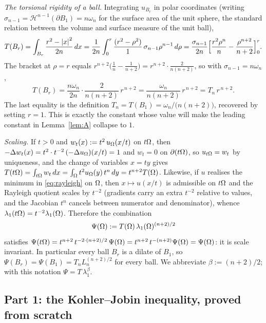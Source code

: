 \emph{The torsional rigidity of a ball.} Integrating $u_{B_r}$ in polar
coordinates (writing $\sigma_{n-1}=\mathcal H^{n-1}(\partial B_1)=n\omega_n$
for the surface area of the unit sphere, the standard relation between the
volume and surface measure of the unit ball),
\[
  T(B_r)=\int_{B_r}\frac{r^2-\left|x\right|^2}{2n}\,dx
  =\frac{1}{2n}\int_0^r\frac{(r^2-\rho^2)}{1}\,\sigma_{n-1}\rho^{n-1}\,d\rho
  =\frac{\sigma_{n-1}}{2n}\Bigl[\frac{r^2\rho^n}{n}-\frac{\rho^{n+2}}{n+2}
     \Bigr]_0^r .
\]
The bracket at $\rho=r$ equals
$r^{n+2}\bigl(\tfrac1n-\tfrac1{n+2}\bigr)
=r^{n+2}\cdot\tfrac{2}{n(n+2)}$, so with $\sigma_{n-1}=n\omega_n$,
\begin{equation}\label{eq:torsionball}
  T(B_r)=\frac{n\omega_n}{2n}\cdot\frac{2}{n(n+2)}\,r^{\,n+2}
  =\frac{\omega_n}{n(n+2)}\,r^{\,n+2}=T_n\,r^{\,n+2}.
\end{equation}
The last equality is the definition $T_n=T(B_1)=\omega_n/\bigl(n(n+2)\bigr)$,
recovered by setting $r=1$. This is exactly the constant whose value will
make the leading constant in Lemma~\ref{lem:A} collapse to $1$.

\emph{Scaling.} If $t>0$ and $w_t(x):=t^2\,u_\Omega(x/t)$ on $t\Omega$, then
$-\Delta w_t(x)=t^2\cdot t^{-2}\,(-\Delta u_\Omega)(x/t)=1$ and $w_t=0$ on
$\partial(t\Omega)$, so $u_{t\Omega}=w_t$ by uniqueness, and the change of
variables $x=ty$ gives
$T(t\Omega)=\int_{t\Omega}w_t\,dx=\int_\Omega t^2u_\Omega(y)\,t^n\,dy=t^{n+2}T(\Omega)$.
Likewise, if $u$ realises the minimum in \eqref{eq:rayleigh} on $\Omega$, then
$x\mapsto u(x/t)$ is admissible on $t\Omega$ and the Rayleigh quotient scales
by $t^{-2}$ (gradients carry an extra $t^{-2}$ relative to values, and the
Jacobian $t^n$ cancels between numerator and denominator), whence
$\lambda_1(t\Omega)=t^{-2}\lambda_1(\Omega)$. Therefore the combination
\begin{equation}\label{eq:psi-def}
  \Psi(\Omega):=T(\Omega)\,\lambda_1(\Omega)^{(n+2)/2}
\end{equation}
satisfies $\Psi(t\Omega)=t^{n+2}\,t^{-2\cdot(n+2)/2}\,\Psi(\Omega)
=t^{n+2}\,t^{-(n+2)}\Psi(\Omega)=\Psi(\Omega)$: it is scale invariant. In
particular every ball $B_r$ is a dilate of $B_1$, so
$\Psi(B_r)=\Psi(B_1)=T_n L_n^{(n+2)/2}$ for every ball. We abbreviate
$\beta:=(n+2)/2$; with this notation $\Psi=T\,\lambda_1^{\beta}$.

\subsection{Part 1: the Kohler--Jobin inequality, proved from scratch}
\label{ssec:kj-proof}

